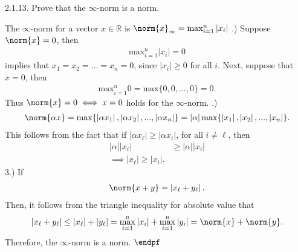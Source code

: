 \documentclass{report}
\begin{document}
    \bigbreak \noindent 
    \begin{mdframed}
        2.1.13.  Prove that the $\infty$-norm is a norm.
    \end{mdframed}
    \bigbreak \noindent 
    The $\infty$-norm for a vector $x\in \mathbb{R}$ is $\norm{x}_{\infty} = \max_{i=1}^{n}\left\lvert x_{i} \right\rvert  $
    \bigbreak {}.) Suppose $\norm{x} = 0$, then
    \begin{align*}
        \text{max}_{i=1}^{n} \left\lvert x_{i} \right\rvert = 0 
    \end{align*}
    implies that $x_{1} = x_{2} = ... = x_{n} = 0$, since $\left\lvert x_{i} \right\rvert \geq 0$ for all $i$. Next, suppose that $x=0$, then 
    \begin{align*}
       \text{max}_{i=1}^{n} 0  = \text{max}\{0,0,...,0\}  = 0
    .\end{align*}
    Thus $\norm{x} = 0 \iff x = 0$ holds for the $\infty$-norm.
    \bigbreak {}.) 
    \begin{align*}
        \norm{\alpha x} = \max\{\left\lvert \alpha x_{1} \right\rvert, \left\lvert \alpha x_{2} \right\rvert, ..., \left\lvert \alpha x_{n} \right\rvert\} = \left\lvert \alpha \right\rvert \max \{\left\lvert x_{1} \right\rvert, \left\lvert x_{2} \right\rvert, ..., \left\lvert x_{n} \right\rvert\}
    .\end{align*}
    This follows from the fact that if $\left\lvert \alpha x_{\ell} \right\rvert \geq \left\lvert \alpha x_{i} \right\rvert$, for all $i\ne \ell$, then 
    \begin{align*}
        \left\lvert \alpha \right\rvert \left\lvert x_{\ell} \right\rvert &\geq \left\lvert \alpha \right\rvert \left\lvert x_{i} \right\rvert \\
        \implies \left\lvert x_{\ell} \right\rvert \geq \left\lvert x_{i} \right\rvert
    .\end{align*}
    3.) If 
    \begin{align*}
        \norm{x + y} = \left\lvert x_{\ell} + y_{\ell} \right\rvert
    .\end{align*}
    Then, it follows from the triangle inequality for absolute value that
    \begin{align*}
        \left\lvert x_{\ell} + y_{\ell} \right\rvert \leq \left\lvert x_{\ell} \right\rvert + \left\lvert y_{\ell} \right\rvert = \max_{i=1}^{n}\left\lvert x_{i} \right\rvert + \max_{i=1}^{n}\left\lvert y_{i} \right\rvert = \norm{x} + \norm{y}
    .\end{align*}
    Therefore, the $\infty$-norm is a norm. $\endpf $
\end{document}
